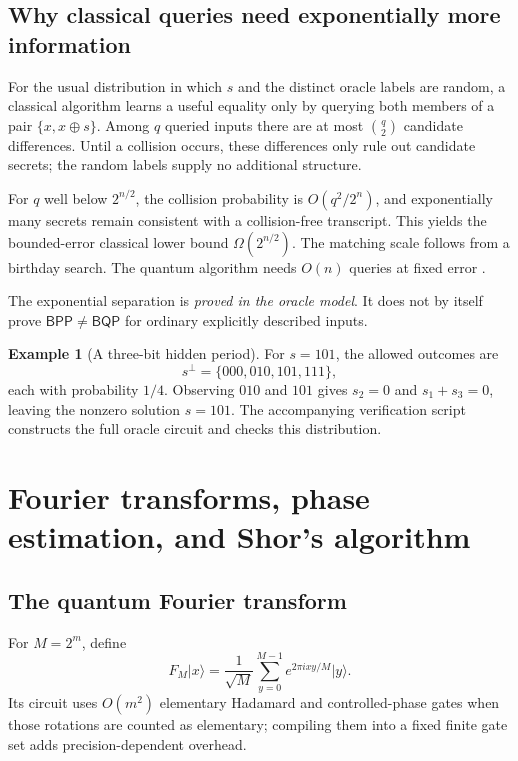 \documentclass[11pt,a4paper]{article}
\newcommand{\ket}[1]{\lvert #1\rangle}
\newcommand{\BPP}{\mathsf{BPP}}
\newcommand{\BQP}{\mathsf{BQP}}
\theoremstyle{definition}
\newtheorem{example}[theorem]{Example}
\theoremstyle{remark}
\numberwithin{equation}{section}
\begin{document}
\subsection{Why classical queries need exponentially more information}
For the usual distribution in which $s$ and the distinct oracle labels are
random, a classical algorithm learns a useful equality only by querying
both members of a pair $\{x,x\oplus s\}$. Among $q$ queried inputs there are
at most $\binom{q}{2}$ candidate differences. Until a collision occurs, these
differences only rule out candidate secrets; the random labels supply no
additional structure.

For $q$ well below $2^{n/2}$, the collision probability is
$O(q^2/2^n)$, and exponentially many secrets remain consistent with a
collision-free transcript. This yields the bounded-error classical lower
bound $\Omega(2^{n/2})$. The matching scale follows from a birthday search.
The quantum algorithm needs $O(n)$ queries at fixed error \citep{simon1997}.

The exponential separation is \emph{proved in the oracle model}. It does not
by itself prove $\BPP\ne\BQP$ for ordinary explicitly described inputs.

\begin{example}[A three-bit hidden period]
For $s=101$, the allowed outcomes are
\begin{equation}
 s^\perp=\{000,010,101,111\},
\end{equation}
each with probability $1/4$. Observing $010$ and $101$ gives
$s_2=0$ and $s_1+s_3=0$, leaving the nonzero solution $s=101$.
The accompanying verification script constructs the full oracle circuit and checks this
distribution.
\end{example}

\section{Fourier transforms, phase estimation, and Shor's algorithm}\label{sec:shor}
\subsection{The quantum Fourier transform}
For $M=2^m$, define
\begin{equation}\label{eq:qft}
 F_M\ket{x}=\frac1{\sqrt M}\sum_{y=0}^{M-1}
 e^{2\pi ixy/M}\ket{y}.
\end{equation}
Its circuit uses $O(m^2)$ elementary Hadamard and controlled-phase gates
when those rotations are counted as elementary; compiling them into a
fixed finite gate set adds precision-dependent overhead.
\end{document}
